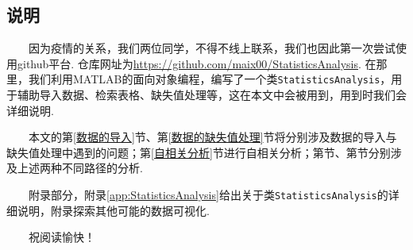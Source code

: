 \documentclass[a4paper, titlepage]{article}
\begin{document}
        \subsection{说明}
        　　因为疫情的关系，我们两位同学，不得不线上联系，我们也因此第一次尝试使用github平台. 仓库网址为\url{https://github.com/maix00/StatisticsAnalysis}. 在那里，我们利用MATLAB的面向对象编程，编写了一个类\texttt{StatisticsAnalysis}，用于辅助导入数据、检索表格、缺失值处理等，这在本文中会被用到，用到时我们会详细说明.

        　　本文的第\ref{数据的导入}节、第\ref{数据的缺失值处理}节将分别涉及数据的导入与缺失值处理中遇到的问题；第\ref{自相关分析}节进行自相关分析；第节、第节分别涉及上述两种不同路径的分析. 
        
        　　附录部分，附录\ref{app:StatisticsAnalysis}给出关于类\texttt{StatisticsAnalysis}的详细说明，附录探索其他可能的数据可视化.

        　　祝阅读愉快！
    
    \newpage
\end{document}
